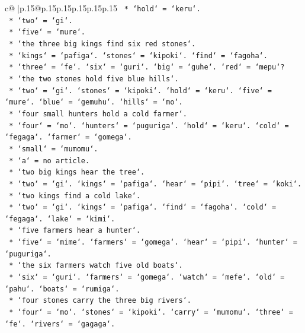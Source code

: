 \documentclass{article}
\begin{document}
{\begin{supertabular}{c@{$\;$}|p{.15\linewidth}@{}p{.15\linewidth}p{.15\linewidth}p{.15\linewidth}p{.15\linewidth}p{.15\linewidth}}
{{{\texttt{            *   `hold` = `keru`.} \\
\texttt{            *   `two` = `gi`.} \\
\texttt{            *   `five` = `mure`.} \\
\texttt{            *   `the three big kings find six red stones`.} \\
\texttt{            *   `kings` = `pafiga`. `stones` = `kipoki`. `find` = `fagoha`.} \\
\texttt{            *   `three` = `fe`. `six` = `guri`. `big` = `guhe`. `red` = `mepu`?} \\
\texttt{            *   `the two stones hold five blue hills`.} \\
\texttt{            *   `two` = `gi`. `stones` = `kipoki`. `hold` = `keru`. `five` = `mure`. `blue` = `gemuhu`. `hills` = `mo`.} \\
\texttt{            *   `four small hunters hold a cold farmer`.} \\
\texttt{            *   `four` = `mo`. `hunters` = `puguriga`. `hold` = `keru`. `cold` = `fegaga`. `farmer` = `gomega`.} \\
\texttt{            *   `small` = `mumomu`.} \\
\texttt{            *   `a` = no article.} \\
\texttt{            *   `two big kings hear the tree`.} \\
\texttt{            *   `two` = `gi`. `kings` = `pafiga`. `hear` = `pipi`. `tree` = `koki`.} \\
\texttt{            *   `two kings find a cold lake`.} \\
\texttt{            *   `two` = `gi`. `kings` = `pafiga`. `find` = `fagoha`. `cold` = `fegaga`. `lake` = `kimi`.} \\
\texttt{            *   `five farmers hear a hunter`.} \\
\texttt{            *   `five` = `mime`. `farmers` = `gomega`. `hear` = `pipi`. `hunter` = `puguriga`.} \\
\texttt{            *   `the six farmers watch five old boats`.} \\
\texttt{            *   `six` = `guri`. `farmers` = `gomega`. `watch` = `mefe`. `old` = `pahu`. `boats` = `rumiga`.} \\
\texttt{            *   `four stones carry the three big rivers`.} \\
\texttt{            *   `four` = `mo`. `stones` = `kipoki`. `carry` = `mumomu`. `three` = `fe`. `rivers` = `gagaga`.} \\
}}}
\end{supertabular}}
\end{document}
